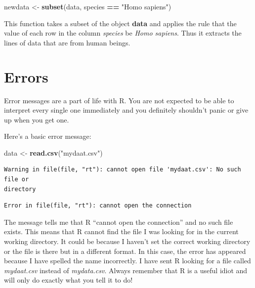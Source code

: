 \documentclass[
]{book}
\newenvironment{Shaded}{\begin{snugshade}}{\end{snugshade}}
\newcommand{\KeywordTok}[1]{\textcolor[rgb]{0.13,0.29,0.53}{\textbf{#1}}}
\newcommand{\NormalTok}[1]{#1}
\newcommand{\OperatorTok}[1]{\textcolor[rgb]{0.81,0.36,0.00}{\textbf{#1}}}
\newcommand{\StringTok}[1]{\textcolor[rgb]{0.31,0.60,0.02}{#1}}
\begin{document}
\begin{Shaded}
\begin{Highlighting}[]
\NormalTok{newdata \textless{}{-}}\StringTok{ }\KeywordTok{subset}\NormalTok{(data, species }\OperatorTok{==}\StringTok{ "Homo sapiens"}\NormalTok{)}
\end{Highlighting}
\end{Shaded}

This function takes a subset of the object \textbf{data} and applies the rule that the value of each row in the column \emph{species} be \emph{Homo sapiens}. Thus it extracts the lines of data that are from human beings.

\hypertarget{errors}{%
\section{Errors}\label{errors}}

Error messages are a part of life with R. You are not expected to be able to interpret every single one immediately and you definitely shouldn't panic or give up when you get one.

Here's a basic error message:

\begin{Shaded}
\begin{Highlighting}[]
\NormalTok{data \textless{}{-}}\StringTok{ }\KeywordTok{read.csv}\NormalTok{(}\StringTok{"mydaat.csv"}\NormalTok{)}
\end{Highlighting}
\end{Shaded}

\begin{verbatim}
Warning in file(file, "rt"): cannot open file 'mydaat.csv': No such file or
directory
\end{verbatim}

\begin{verbatim}
Error in file(file, "rt"): cannot open the connection
\end{verbatim}

The message tells me that R ``cannot open the connection'' and no such file exists. This means that R cannot find the file I was looking for in the current working directory. It could be because I haven't set the correct working directory or the file is there but in a different format. In this case, the error has appeared because I have spelled the name incorrectly. I have sent R looking for a file called \emph{mydaat.csv} instead of \emph{mydata.csv}. Always remember that R is a useful idiot and will only do exactly what you tell it to do!
\end{document}
